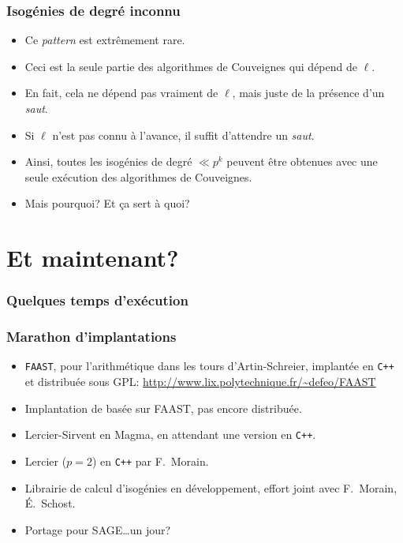 \documentclass[10pt]{beamer}
\newcommand{\0}{\mathcal{O}}  %
\begin{document}
\begin{frame}
  \frametitle{Isogénies de degré inconnu}
  
  \begin{itemize}
  \item Ce \emph{pattern} est extrêmement rare.
  \item Ceci est la seule partie des algorithmes de Couveignes qui dépend de $\ell$.
  \item<2-> \large En fait, cela ne dépend pas vraiment de $\ell$, mais juste de
    la présence d'un \emph{saut}.
  \item<2-> \large Si $\ell$ n'est pas connu à l'avance, il suffit d'attendre
    un \emph{saut}.
  \item<2-> \large Ainsi, toutes les isogénies de degré $\ll p^k$ peuvent être
    obtenues avec une seule exécution des algorithmes de Couveignes.
  \item<3-> \Large Mais pourquoi? Et ça sert à quoi?
  \end{itemize}  
\end{frame}


\section{Et maintenant?}

\begin{frame}
  \frametitle{Quelques temps d'exécution}
  
\end{frame}


\begin{frame}
  \frametitle{Marathon d'implantations}

  \begin{itemize}
  \item \texttt{FAAST}, pour l'arithmétique dans les tours
    d'Artin-Schreier, implantée en \texttt{C++} et distribuée sous
    GPL: \url{http://www.lix.polytechnique.fr/~defeo/FAAST}
  \item Implantation de \cite{couveignes96} basée sur FAAST, pas encore distribuée.
  \item Lercier-Sirvent en Magma, en attendant une version en \texttt{C++}.
  \item Lercier ($p=2$) en \texttt{C++} par F.~Morain.
  \item Librairie de calcul d'isogénies en développement, effort joint
    avec F.~Morain, É.~Schost.
  \item Portage pour SAGE\dots un jour?
  \end{itemize}
\end{frame}
\end{document}
